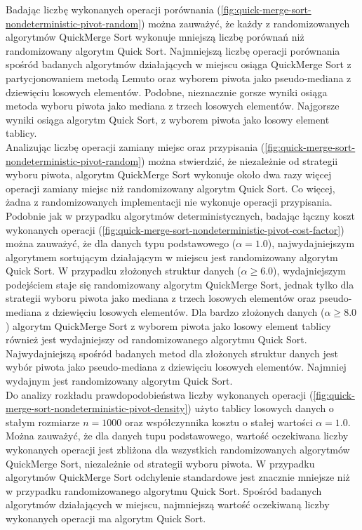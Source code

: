 Badając liczbę wykonanych operacji porównania (\ref{fig:quick-merge-sort-nondeterministic-pivot-random}) można zauważyć, 
że każdy z randomizowanych algorytmów QuickMerge Sort wykonuje mniejszą liczbę porównań niż randomizowany algorytm Quick Sort. Najmniejszą liczbę operacji porównania spośród badanych algorytmów działających w miejscu osiąga QuickMerge Sort z partycjonowaniem metodą Lemuto oraz wyborem piwota jako pseudo-mediana z dziewięciu losowych elementów. Podobne, nieznacznie gorsze wyniki osiąga metoda wyboru piwota jako mediana z trzech losowych elementów. Najgorsze wyniki osiąga algorytm Quick Sort, z wyborem piwota jako losowy element tablicy.\\

Analizując liczbę operacji zamiany miejsc oraz przypisania (\ref{fig:quick-merge-sort-nondeterministic-pivot-random}) można stwierdzić, że niezależnie od strategii wyboru piwota, algorytm QuickMerge Sort wykonuje około dwa razy więcej operacji zamiany miejsc niż randomizowany algorytm Quick Sort. Co więcej, żadna z randomizowanych implementacji nie wykonuje operacji przypisania.\\

Podobnie jak w przypadku algorytmów deterministycznych, badając łączny koszt wykonanych operacji (\ref{fig:quick-merge-sort-nondeterministic-pivot-cost-factor}) można zauważyć, że dla danych typu podstawowego ($\alpha = 1.0$), najwydajniejszym algorytmem sortującym działającym w miejscu jest randomizowany algorytm Quick Sort.
W przypadku złożonych struktur danych ($\alpha \ge 6.0$), wydajniejszym podejściem staje się randomizowany algorytm QuickMerge Sort, jednak tylko dla strategii wyboru piwota jako mediana z trzech losowych elementów oraz pseudo-mediana z dziewięciu losowych elementów. Dla bardzo złożonych danych ($\alpha \ge 8.0$) algorytm QuickMerge Sort z wyborem piwota jako losowy element tablicy również jest wydajniejszy od randomizowanego algorytmu Quick Sort. Najwydajniejszą spośród badanych metod dla złożonych struktur danych jest wybór piwota jako pseudo-mediana z dziewięciu losowych elementów. Najmniej wydajnym jest randomizowany algorytm Quick Sort.\\


Do analizy rozkładu prawdopodobieństwa liczby wykonanych operacji (\ref{fig:quick-merge-sort-nondeterministic-pivot-density}) użyto tablicy losowych danych o stałym rozmiarze $n = 1000$ oraz współczynnika kosztu o stałej wartości $\alpha = 1.0$. Można zauważyć, że dla danych tupu podstawowego, wartość oczekiwana liczby wykonanych operacji jest zbliżona dla wszystkich randomizowanych algorytmów QuickMerge Sort, niezależnie od strategii wyboru piwota. W przypadku algorytmów QuickMerge Sort odchylenie standardowe jest znacznie mniejsze niż w przypadku randomizowanego algorytmu Quick Sort. Spośród badanych algorytmów działających w miejscu, najmniejszą wartość oczekiwaną liczby wykonanych operacji ma algorytm Quick Sort.\\

